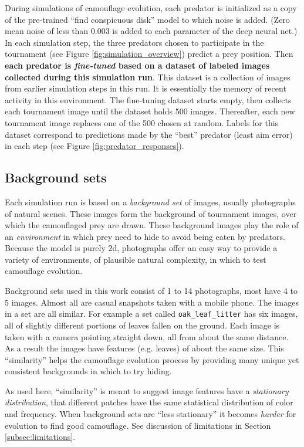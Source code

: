 \documentclass[acmtog]{acmart}
\newcommand{\jargon}[1]{\textit{#1}}
\begin{document}
\par
During simulations of camouflage evolution, each predator is initialized as a copy of the pre-trained “find conspicuous disk” model to which noise is added. (Zero mean noise of less than 0.003 is added to each parameter of the deep neural net.) In each simulation step, the three predators chosen to participate in the tournament (see Figure \ref{fig:simulation_overview}) predict a prey position. Then \textbf{each predator is \jargon{fine-tuned} based on a dataset of labeled images collected during this simulation run}. This dataset is a collection of images from earlier simulation steps in this run. It is essentially the memory of recent activity in this environment. The fine-tuning dataset starts empty, then collects each tournament image until the dataset holds 500 images. Thereafter, each new tournament image replaces one of the 500 chosen at random. Labels for this dataset correspond to predictions made by the “best” predator (least aim error) in each step (see Figure \ref{fig:predator_responses}).
\par


\subsection{Background sets}
\label{subsec:background_sets}
Each simulation run is based on a \jargon{background set} of images, usually photographs of natural scenes. These images form the background of tournament images, over which the camouflaged prey are drawn. These background images play the role of an \jargon{environment} in which prey need to hide to avoid being eaten by predators. Because the model is purely 2d, photographs offer an easy way to provide a variety of environments, of plausible natural complexity, in which to test camouflage evolution.
\par
Background sets used in this work consist of 1 to 14 photographs, most have 4 to 5 images. Almost all are casual snapshots taken with a mobile phone. The images in a set are all similar. For example a set called \texttt{oak\_leaf\_litter} has six images, all of slightly different portions of leaves fallen on the ground. Each image is taken with a camera pointing straight down, all from about the same distance. As a result the images have features (e.g. leaves) of about the same size. This “similarity” helps the camouflage evolution process by providing many unique yet consistent backgrounds in which to try hiding.
\par
As used here, “similarity” is meant to suggest image features have a \jargon{stationary distribution}, that different patches have the same statistical distribution of color and frequency. When background sets are “less stationary” it becomes \jargon{harder} for evolution to find good camouflage. See discussion of limitations in Section \ref{subsec:limitations}.
\end{document}
